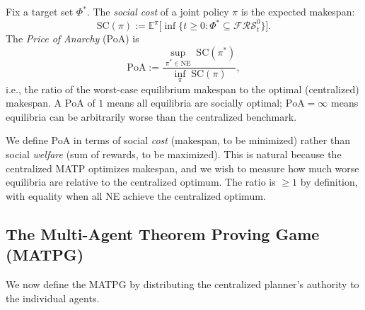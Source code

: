 \begin{definition}\label{def:poa}
Fix a target set $\Phi^*$. The \emph{social cost} of a joint policy $\pi$ is the expected makespan:
\[
\mathrm{SC}(\pi) := \mathbb{E}^\pi\!\big[\inf\{t\ge 0 : \Phi^*\subseteq\mathcal{FRS}^0_t\}\big].
\]
The \emph{Price of Anarchy} (PoA) is
\[
\mathrm{PoA} := \frac{\sup_{\pi^*\in\mathrm{NE}}\;\mathrm{SC}(\pi^*)}{\inf_{\pi}\;\mathrm{SC}(\pi)},
\]
i.e., the ratio of the worst-case equilibrium makespan to the optimal (centralized) makespan. A $\mathrm{PoA}$ of $1$ means all equilibria are socially optimal; $\mathrm{PoA} = \infty$ means equilibria can be arbitrarily worse than the centralized benchmark.
\end{definition}

\begin{remark}
We define PoA in terms of social \emph{cost} (makespan, to be minimized) rather than social \emph{welfare} (sum of rewards, to be maximized). This is natural because the centralized MATP optimizes makespan, and we wish to measure how much worse equilibria are relative to the centralized optimum. The ratio is $\ge 1$ by definition, with equality when all NE achieve the centralized optimum.
\end{remark}


\subsection{The Multi-Agent Theorem Proving Game (MATPG)}\label{sec:matpg}

We now define the MATPG by distributing the centralized planner's authority to the individual agents.

